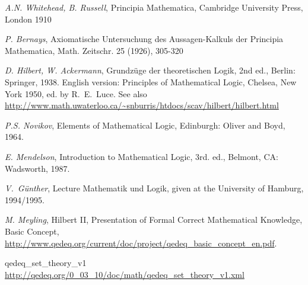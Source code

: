 \documentclass[a4paper,german,10pt,twoside]{book}
\theoremstyle{definition}
\theoremstyle{remark}
\begin{document}

\begin{thebibliography}{99}
 \emph{A.N. Whitehead, B. Russell}, Principia Mathematica, Cambridge University Press, London 1910

 \emph{P. Bernays}, Axiomatische Untersuchung des Aussagen-Kalkuls der {\glqq Principia Mathematica\grqq}, Math. Zeitschr. 25 (1926), 305-320

 \emph{D. Hilbert, W. Ackermann}, Grundz{\"u}ge der theoretischen Logik, 2nd ed., Berlin: Springer, 1938. English version: Principles of Mathematical Logic, Chelsea, New York 1950, ed. by R.~E.~Luce.
See also \url{http://www.math.uwaterloo.ca/~snburris/htdocs/scav/hilbert/hilbert.html}

 \emph{P.S. Novikov}, Elements of Mathematical Logic, Edinburgh: Oliver and Boyd, 1964.

 \emph{E. Mendelson}, Introduction to Mathematical Logic, 3rd. ed., Belmont, CA: Wadsworth, 1987.

 \emph{V.~G{\"u}nther}, Lecture {\glqq Mathematik und Logik\grqq}, given at the University of Hamburg, 1994/1995.

 \emph{M. Meyling}, Hilbert II, Presentation of Formal Correct Mathematical Knowledge, Basic Concept,
\url{http://www.qedeq.org/current/doc/project/qedeq_basic_concept_en.pdf}.



 qedeq\_set\_theory\_v1 \url{http://qedeq.org/0_03_10/doc/math/qedeq_set_theory_v1.xml}


\end{thebibliography}
\backmatter

 \printindex
\end{document}
